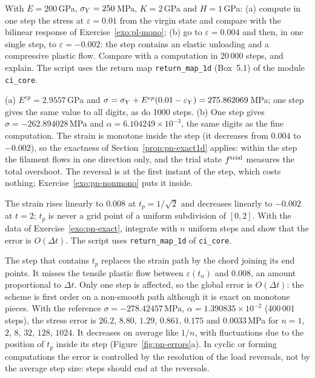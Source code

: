 \label{exo:pn-exact}
%
With $E=200$\,GPa, $\sigma_{Y}=250$\,MPa, $K=2$\,GPa and $H=1$\,GPa: (a) compute in
one step the stress at $\varepsilon=0.01$ from the virgin state and compare
with the bilinear response of Exercise~\ref{exo:pl-mono}; (b) go to
$\varepsilon=0.004$ and then, in one single step, to $\varepsilon=-0.002$:
the step contains an elastic unloading and a compressive plastic flow. Compare
with a computation in 20\,000 steps, and explain. The script uses the return
map \texttt{return\_map\_1d} (Box~5.1) of the module \texttt{ci\_core}.
\begin{solution}
(a) $E^{ep}=2.9557$\,GPa and $\sigma=\sigma_{Y}+E^{ep}(0.01-\varepsilon_Y)=275.862069$\,MPa; one
step gives the same value to all digits, as do 1000 steps. (b) One step gives
$\sigma=-262.894028$\,MPa and $\alpha=6.104249\times10^{-3}$, the same digits
as the fine computation. The strain is monotone inside the step (it decreases
from $0.004$ to $-0.002$), so the exactness of Section~\ref{prop:pn-exact1d} applies: within
the step the filament flows in one direction only, and the trial state
$f^{\mathrm{trial}}$ measures the total overshoot. The reversal is at the first instant
of the step, which costs nothing; Exercise~\ref{exo:pn-nonmono} puts it inside.

\end{solution}

\label{exo:pn-nonmono}
The strain rises linearly to $0.008$ at $t_p=1/\sqrt2$ and decreases linearly
to $-0.002$ at $t=2$; $t_p$ is never a grid point of a uniform subdivision of
$[0,2]$. With the data of Exercise~\ref{exo:pn-exact}, integrate with $n$
uniform steps and show that the error is $O(\Delta t)$. The script uses
\texttt{return\_map\_1d} of \texttt{ci\_core}.
\begin{solution}
The step that contains $t_p$ replaces the strain path by the chord joining
its end points. It misses the tensile plastic flow between
$\varepsilon(t_n)$ and $0.008$, an amount proportional to $\Delta t$. Only one
step is affected, so the global error is $O(\Delta t)$: the scheme is first
order on a non-smooth path although it is exact on monotone pieces. With the
reference $\sigma=-278.42457$\,MPa, $\alpha=1.390835\times10^{-2}$ (400\,001
steps), the stress error is $26.2$, $8.80$, $1.29$, $0.861$, $0.175$ and
$0.0033$\,MPa for $n=1$, $2$, $8$, $32$, $128$, $1024$. It decreases on
average like $1/n$, with fluctuations due to the position of $t_p$ inside its
step (Figure~\ref{fig:pn-errors}a). In cyclic or forming computations the error is controlled by the
resolution of the load reversals, not by the average step size: steps should
end at the reversals.

\end{solution}

